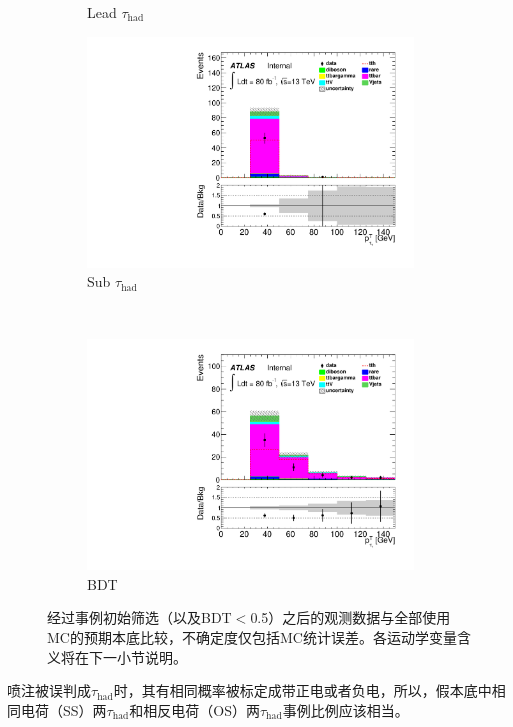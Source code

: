 \begin{figure}[h]
\begin{subfigure}[b]{0.45\textwidth}
 \caption{Lead $\tau_{\text{had}}$ \pt}
\end{subfigure}
\begin{subfigure}[b]{0.45\textwidth}
 \includegraphics[width=0.95\textwidth,angle=-90]{fig/OneL2taulowBDTOS/tau_pt_1_F.pdf}
 \caption{Sub $\tau_{\text{had}}$ \pt}
\end{subfigure}\\
\begin{subfigure}[b]{0.45\textwidth}
 \includegraphics[width=0.95\textwidth,angle=-90]{fig/OneL2taulowBDTOS/tau_pt_0_F.pdf}
 \caption{BDT}
\end{subfigure}
\caption{经过\ltwotau 事例初始筛选（以及BDT$<$0.5）之后的观测数据与全部使用MC的预期本底比较，不确定度仅包括MC统计误差。各运动学变量含义将在下一小节说明。}
\label{fig:dataBkg_1l2tau_allMC}
\end{figure}
喷注被误判成$\tau_{\text{had}}$时，其有相同概率被标定成带正电或者负电，所以，假本底中相同电荷（SS）两$\tau_{\text{had}}$和相反电荷（OS）两$\tau_{\text{had}}$事例比例应该相当。
